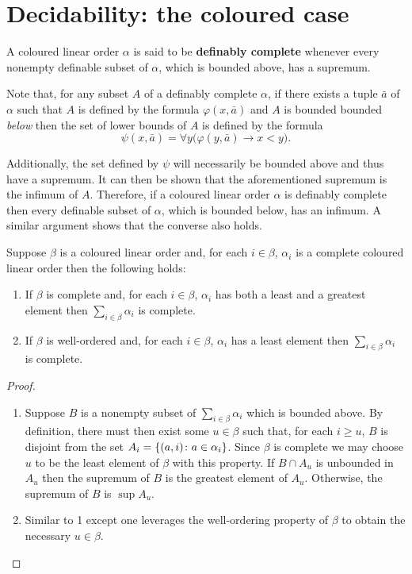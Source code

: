 \section{Decidability: the coloured case}

\begin{dfn}
	A coloured linear order $\alpha$ is said to be \textbf{definably complete} whenever every nonempty definable subset of $\alpha$, which is bounded above, has a supremum.
\end{dfn}

Note that, for any subset $A$ of a definably complete $\alpha$, if there exists a tuple $\bar{a}$ of $\alpha$ such that $A$ is defined by the formula $\varphi(x,\bar{a})$ and $A$ is bounded bounded \textit{below} then the set of lower bounds of $A$ is defined by the formula
\begin{equation}
	\psi(x,\bar{a})=\forall y\big(\varphi(y,\bar{a})\rightarrow x<y\big).
\end{equation}

Additionally, the set defined by $\psi$ will necessarily be bounded above and thus have a supremum.  It can then be shown that the aforementioned supremum is the infimum of $A$.  Therefore, if a coloured linear order $\alpha$ is definably complete then every definable subset of $\alpha$, which is bounded below, has an infimum.  A similar argument shows that the converse also holds.

\begin{lem}
	Suppose $\beta$ is a coloured linear order and, for each $i\in\beta$, $\alpha_i$ is a complete coloured linear order then the following holds:
	\begin{enumerate}
		\item	If $\beta$ is complete and, for each $i\in\beta$, $\alpha_i$ has both a least and a greatest element then $\sum_{i\in\beta}\alpha_i$ is complete.
		\item	If $\beta$ is well-ordered and, for each $i\in\beta$, $\alpha_i$ has a least element then $\sum_{i\in\beta}\alpha_i$ is complete.
	\end{enumerate}
\end{lem}
\begin{proof}
	\begin{enumerate}[nosep]
		\item	Suppose $B$ is a nonempty subset of $\sum_{i\in\beta}\alpha_i$ which is bounded above.  By definition, there must then exist some $u\in\beta$ such that, for each $i\geq u$, $B$ is disjoint from the set $A_i=\left\lbrace (a,i)\colon a\in\alpha_i \right\rbrace$.  Since $\beta$ is complete we may choose $u$ to be the least element of $\beta$ with this property.  If $B\cap A_u$ is unbounded in $A_u$ then the supremum of $B$ is the greatest element of $A_u$.  Otherwise, the supremum of $B$ is $\sup A_u$.
		\item	Similar to 1 except one leverages the well-ordering property of $\beta$ to obtain the necessary $u\in\beta$.\qedhere
	\end{enumerate}
\end{proof}

